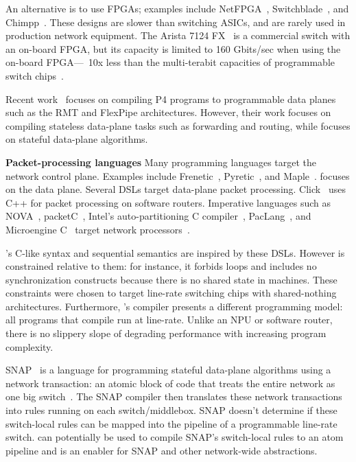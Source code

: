 An alternative is to use FPGAs; examples include NetFPGA~\cite{netfpga},
Switchblade~\cite{switchblade}, and Chimpp~\cite{chimpp}.  These designs are
slower than switching ASICs, and are rarely used in production network
equipment. The Arista 7124 FX~\cite{7124fx} is a commercial switch with an
on-board FPGA, but its capacity is limited to 160 Gbits/sec when using the
on-board FPGA---~10x less than the multi-terabit capacities of programmable
switch chips~\cite{xpliant}.

Recent work~\cite{lavanya_compiler} focuses on compiling P4 programs to
programmable data planes such as the RMT and FlexPipe architectures. However,
their work focuses on compiling stateless data-plane tasks such as forwarding
and routing, while \pktlanguage focuses on stateful data-plane algorithms.

\textbf{Packet-processing languages}
Many programming languages target the network control plane. Examples include
Frenetic~\cite{frenetic}, Pyretic~\cite{pyretic}, and Maple~\cite{maple}.
\pktlanguage focuses on the data plane. Several DSLs target data-plane packet
processing. Click~\cite{click} uses C++ for packet processing on software
routers. Imperative languages such as NOVA~\cite{nova}, packetC~\cite{packetc},
Intel's auto-partitioning C compiler~\cite{intel_uiuc_pldi},
PacLang~\cite{paclang_lang, paclang_partitioner}, and Microengine
C~\cite{microenginec, intel_ixa} target network processors~\cite{ixp2800,
ixp4xx}.

\pktlanguage's C-like syntax and sequential semantics are inspired by these
DSLs. However \pktlanguage is constrained relative to them: for instance, it
forbids loops and includes no synchronization constructs because there is no
shared state in \absmachine machines. These constraints were chosen to target
line-rate switching chips with shared-nothing architectures.  Furthermore,
\pktlanguage's compiler presents a different programming model: all
\pktlanguage programs that compile run at line-rate. Unlike an NPU or software
router, there is no slippery slope of degrading performance with increasing
program complexity.

SNAP~\cite{snap} is a language for programming stateful data-plane algorithms
using a network transaction: an atomic block of code that treats the entire
network as one big switch~\cite{onebigswitch}. The SNAP compiler then
translates these network transactions into rules running on each
switch/middlebox. SNAP doesn't determine if these switch-local rules can be
mapped into the pipeline of a programmable line-rate switch. \pktlanguage can
potentially be used to compile SNAP's switch-local rules to an atom pipeline
and is an enabler for SNAP and other network-wide abstractions.
